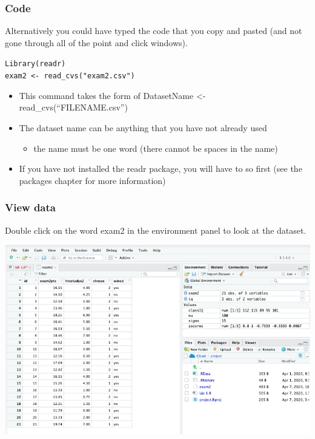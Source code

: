 \documentclass[
]{book}
\providecommand{\tightlist}{%
  \setlength{\itemsep}{0pt}\setlength{\parskip}{0pt}}
\begin{document}
\hypertarget{code}{%
\subsubsection{Code}\label{code}}

Alternatively you could have typed the code that you copy and pasted (and not gone through all of the point and click windows).

\texttt{Library(readr)}\\
\texttt{exam2\ \textless{}-\ read\_cvs("exam2.csv")}

\begin{itemize}
\tightlist
\item
  This command takes the form of DatasetName \textless- read\_cvs(``FILENAME.csv'')\\
\item
  The dataset name can be anything that you have not already used

  \begin{itemize}
  \tightlist
  \item
    the name must be one word (there cannot be spaces in the name)\\
  \end{itemize}
\item
  If you have not installed the readr package, you will have to so first (see the packages chapter for more information)
\end{itemize}

\hypertarget{view-data}{%
\subsubsection{View data}\label{view-data}}

Double click on the word exam2 in the environment panel to look at the dataset.

\includegraphics{img/view.png}
\end{document}
